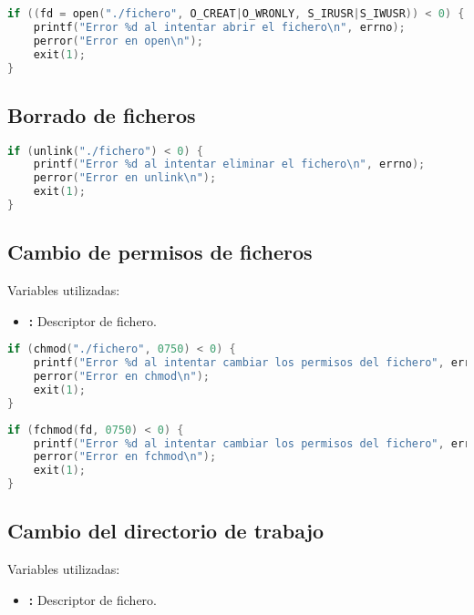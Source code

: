 \begin{lstlisting}[language=C]
if ((fd = open("./fichero", O_CREAT|O_WRONLY, S_IRUSR|S_IWUSR)) < 0) {
	printf("Error %d al intentar abrir el fichero\n", errno);
	perror("Error en open\n");
	exit(1);
}
\end{lstlisting}

\pagebreak

\subsection{Borrado de ficheros}

\begin{lstlisting}[language=C]
if (unlink("./fichero") < 0) {
	printf("Error %d al intentar eliminar el fichero\n", errno);
	perror("Error en unlink\n");
	exit(1);
}
\end{lstlisting}

\subsection{Cambio de permisos de ficheros}

Variables utilizadas:

\begin{itemize}
	\item{}\textbf{:} Descriptor de fichero.
\end{itemize}

\begin{lstlisting}[language=C]
if (chmod("./fichero", 0750) < 0) {
	printf("Error %d al intentar cambiar los permisos del fichero", errno);
	perror("Error en chmod\n");
	exit(1);
}
\end{lstlisting}

\begin{lstlisting}[language=C]
if (fchmod(fd, 0750) < 0) {
	printf("Error %d al intentar cambiar los permisos del fichero", errno);
	perror("Error en fchmod\n");
	exit(1);
}
\end{lstlisting}

\subsection{Cambio del directorio de trabajo}

Variables utilizadas:

\begin{itemize}
	\item{}\textbf{:} Descriptor de fichero.
\end{itemize}

